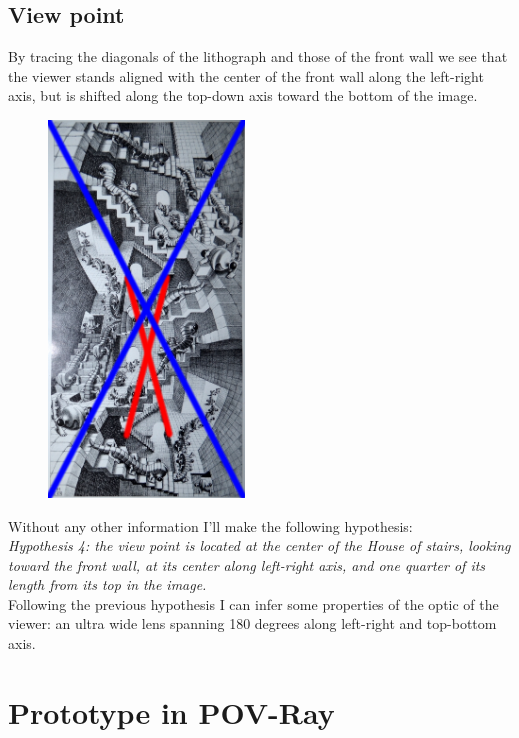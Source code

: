 \documentclass[12pt, a4paper]{article}
\begin{document}
\subsection{View point}

By tracing the diagonals of the lithograph and those of the front wall we see that the viewer stands aligned with the center of the front wall along the left-right axis, but is shifted along the top-down axis toward the bottom of the image.\\

\begin{center}
\begin{figure}[H]
\centering\includegraphics[height=10cm]{./viewpoint.png}\\
\end{figure}
\end{center}

Without any other information I'll make the following hypothesis:\\

\emph{Hypothesis 4: the view point is located at the center of the House of stairs, looking toward the front wall, at its center along left-right axis, and one quarter of its length from its top in the image.}\\

Following the previous hypothesis I can infer some properties of the optic of the viewer: an ultra wide lens spanning 180 degrees along left-right and top-bottom axis.\\

\section{Prototype in POV-Ray}
\end{document}
